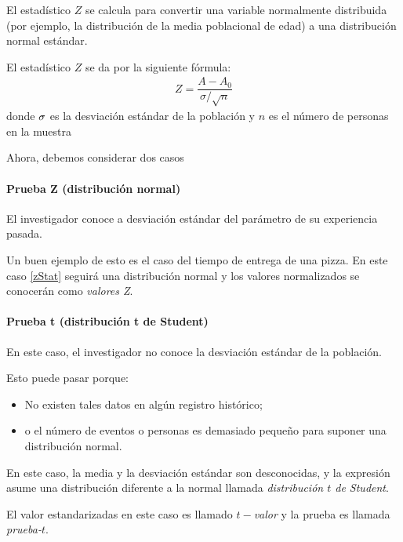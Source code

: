 El estadístico $Z$ se calcula para convertir una variable normalmente distribuida (por ejemplo, la distribución de la media poblacional de edad) a una distribución normal estándar.


El estadístico $Z$ se da por la siguiente fórmula:
\begin{align}
 \label{zStat}
 Z=\dfrac{A-A_{0}}{{\sigma}/{\sqrt{n}}}
\end{align}
donde $\sigma$ es la desviación estándar de la población y $n$ es el número de personas en la muestra


Ahora, debemos considerar dos casos

\paragraph{Prueba Z (distribución normal)}
El investigador conoce a desviación estándar del parámetro de su experiencia pasada.



Un buen ejemplo de esto es el caso del tiempo de entrega de una pizza.  En este caso \eqref{zStat} seguirá una distribución normal y los valores normalizados se conocerán como \emph{valores Z}.

\paragraph{Prueba t (distribución t de Student) }
En este caso, el investigador no conoce la desviación estándar de la población.



Esto puede pasar porque:
\begin{itemize}
 \item No existen tales datos en algún registro histórico;
 \item o el número de eventos o personas es demasiado pequeño para suponer una distribución normal.
\end{itemize}


En este caso, la media y la desviación estándar son desconocidas, y la expresión asume una distribución diferente a la normal llamada \emph{distribución $t$ de Student}.



El valor estandarizadas en este caso es llamado \emph{$t-$valor} y la prueba es llamada \emph{prueba-$t$}.


